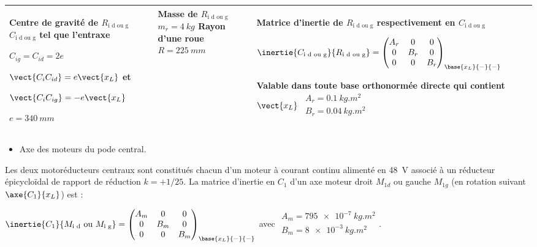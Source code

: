 \begin{center}
\begin{tabular}{|p{4cm}|p{4cm}|p{8cm}|}
\hline
Centre de gravité de $R_{\text{i d ou g}}$ $C_{\text{i d ou g}}$ tel que l'entraxe

$C_{ig}=C_{id}=2e$ 

$\vect{C_i C_{id}}=e\vect{x_L}$ et 

$\vect{C_i C_{ig}}=-e\vect{x_L}$ 

$e=\SI{340}{mm}$ 
&
Masse de $R_{\text{i d ou g}}$ $m_r = \SI{4}{kg}$
Rayon d'une roue $R=\SI{225}{mm}$
& 
Matrice d'inertie de $R_{\text{i d ou g}}$ respectivement en  $C_{\text{i d ou g}}$ 

$\inertie{C_{\text{i d ou g}}}{R_{\text{i d ou g}}}=
\begin{pmatrix} 
A_r & 0 & 0 \\ 0 & B_r & 0 \\ 0 & 0 & B_r 
\end{pmatrix}_{\base{x_L}{-}{-}}$

Valable dans toute base orthonormée directe qui contient $\vect{x_L}$
$
\begin{array}{l}
A_r =\SI{0,1}{kg.m^2} \\
B_r =\SI{0,04}{kg.m^2} \\
\end{array}$\\
\hline
\end{tabular}
\end{center}

\begin{itemize}
\item Axe des moteurs du pode central.
\end{itemize}

Les deux motoréducteurs centraux sont constitués chacun d’un moteur à courant continu alimenté en \SI{48}{V} associé à
un réducteur épicycloïdal de rapport de réduction $k = +1/ 25$. La matrice d’inertie en $C_1$ d’un axe moteur droit $M_{1d}$ ou
gauche $M_{1g}$  (en rotation suivant $\axe{C_1}{x_L}$) est :

$\inertie{C_1}{M_{\text{i d}} \text{ ou } M_{\text{i g}}}=
\begin{pmatrix} 
A_m & 0 & 0 \\ 0 & B_m & 0 \\ 0 & 0 & B_m 
\end{pmatrix}_{\base{x_L}{-}{-}}$
avec 
$\begin{array}{l}
A_m =\SI{795e-7}{kg.m^2} \\
B_m =\SI{8e-3}{kg.m^2} \\
\end{array}$.

